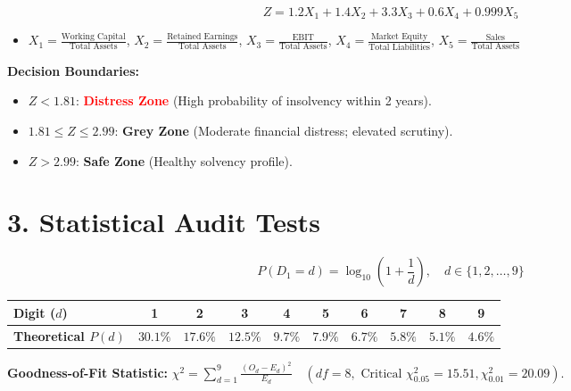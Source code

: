 \begin{tcolorbox}[colback=coralbg, colframe=coralborder, title={\textbf{Altman $Z$-Score (Manufacturing Distress Model)}}]
\begin{equation*}
Z = 1.2 X_1 + 1.4 X_2 + 3.3 X_3 + 0.6 X_4 + 0.999 X_5
\end{equation*}
\begin{itemize}
    \item $X_1 = \frac{\text{Working Capital}}{\text{Total Assets}}$, $X_2 = \frac{\text{Retained Earnings}}{\text{Total Assets}}$, $X_3 = \frac{\text{EBIT}}{\text{Total Assets}}$, $X_4 = \frac{\text{Market Equity}}{\text{Total Liabilities}}$, $X_5 = \frac{\text{Sales}}{\text{Total Assets}}$
\end{itemize}
\textbf{Decision Boundaries:}
\begin{itemize}
    \item $Z < 1.81$: \textcolor{red}{\textbf{Distress Zone}} (High probability of insolvency within 2 years).
    \item $1.81 \le Z \le 2.99$: \textcolor{amberwarning}{\textbf{Grey Zone}} (Moderate financial distress; elevated scrutiny).
    \item $Z > 2.99$: \textcolor{tealdef}{\textbf{Safe Zone}} (Healthy solvency profile).
\end{itemize}
\end{tcolorbox}

\section*{3. Statistical Audit Tests}

\begin{tcolorbox}[colback=purplebg, colframe=purpleborder, title={\textbf{Benford's Law (First-Digit Probability Table)}}]
\begin{equation*}
P(D_1 = d) = \log_{10}\left(1 + \frac{1}{d}\right), \quad d \in \{1, 2, \dots, 9\}
\end{equation*}
\begin{center}
\begin{tabular}{lccccccccc}
\toprule
\textbf{Digit ($d$)} & \textbf{1} & \textbf{2} & \textbf{3} & \textbf{4} & \textbf{5} & \textbf{6} & \textbf{7} & \textbf{8} & \textbf{9} \\
\midrule
\textbf{Theoretical $P(d)$} & $30.1\%$ & $17.6\%$ & $12.5\%$ & $9.7\%$ & $7.9\%$ & $6.7\%$ & $5.8\%$ & $5.1\%$ & $4.6\%$ \\
\bottomrule
\end{tabular}
\end{center}
\textbf{Goodness-of-Fit Statistic:} $\chi^2 = \sum_{d=1}^9 \frac{(O_d - E_d)^2}{E_d} \quad (df = 8, \text{ Critical } \chi^2_{0.05} = 15.51, \chi^2_{0.01} = 20.09)$.
\end{tcolorbox}

